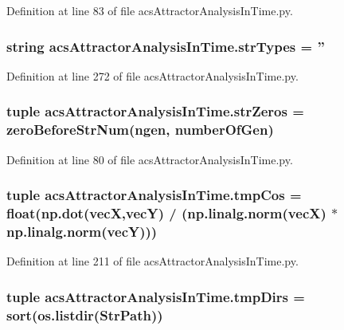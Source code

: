 Definition at line 83 of file acs\-Attractor\-Analysis\-In\-Time.\-py.

\hypertarget{a00092_a80aeec3ef5cc335351588c6f7c4b76cb}{
\subsubsection[{str\-Types}]{\setlength{\rightskip}{0pt plus 5cm}string acs\-Attractor\-Analysis\-In\-Time.\-str\-Types = ''}}\label{a00092_a80aeec3ef5cc335351588c6f7c4b76cb}


Definition at line 272 of file acs\-Attractor\-Analysis\-In\-Time.\-py.

\hypertarget{a00092_a9401cc8fb642e77e034e21ef9babcb24}{
\subsubsection[{str\-Zeros}]{\setlength{\rightskip}{0pt plus 5cm}tuple acs\-Attractor\-Analysis\-In\-Time.\-str\-Zeros = {\bf zero\-Before\-Str\-Num}(ngen, {\bf number\-Of\-Gen})}}\label{a00092_a9401cc8fb642e77e034e21ef9babcb24}


Definition at line 80 of file acs\-Attractor\-Analysis\-In\-Time.\-py.

\hypertarget{a00092_a547703ec10e432928645bbe8d226dceb}{
\subsubsection[{tmp\-Cos}]{\setlength{\rightskip}{0pt plus 5cm}tuple acs\-Attractor\-Analysis\-In\-Time.\-tmp\-Cos = float(np.\-dot({\bf vec\-X},{\bf vec\-Y}) / (np.\-linalg.\-norm({\bf vec\-X}) $\ast$ np.\-linalg.\-norm({\bf vec\-Y})))}}\label{a00092_a547703ec10e432928645bbe8d226dceb}


Definition at line 211 of file acs\-Attractor\-Analysis\-In\-Time.\-py.

\hypertarget{a00092_a4f312756a4e405be853b0a84be7e2e54}{
\subsubsection[{tmp\-Dirs}]{\setlength{\rightskip}{0pt plus 5cm}tuple acs\-Attractor\-Analysis\-In\-Time.\-tmp\-Dirs = sort(os.\-listdir({\bf Str\-Path}))}}\label{a00092_a4f312756a4e405be853b0a84be7e2e54}


